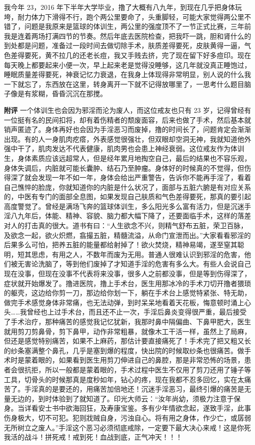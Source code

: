 \begin{case}
    我今年 23，2016 年下半年大学毕业，撸了大概有八九年，到现在几乎把身体玩垮，耐力体力下滑得不行，跑个两公里要命了，头重脚轻，可能大家觉得两公里不错了，问题是我原来是篮球的体训生，两公里的强度顶不了一节正式比赛，三年前我是连着两场打满四节的节奏。然后年底去医院检查，把我吓一跳，胆和肾什么的到处都是问题，准备过一段时间去做切除手术，肤质差得要死，皮肤黄得一逼，气色差得要死，黄不拉几的还老长痘，我又手贱去挤，完了现在留下好多痘印。现在每天晚上都要起来小便一次，早上起来老是觉得没睡够，这几年就没真正睡饱过，睡眠质量差得要死，神衰记忆力衰退，在我身上体现得非常明显，别人说的什么我一下就忘了，东西放在这里，转身离开一下就不记得放哪里了，一思考什么题目脑子像是有浆糊，昏昏沉沉在那搅。

    \textbf{附评} 一个体训生也会因为邪淫而沦为废人，而这位戒友也只有 23 岁，记得曾经有一位挺有名的民间扣将，却有着伤精者的颓废面容，后来也做了手术，然后基本就销声匿迹了。身体再好也会因为手淫恶习而废掉，撸的时间长了，问题肯定会渐渐出现。有的人一身肌肉疙瘩，外表感觉很强壮，但双眼却空洞无神，我就知道他外强中干了，肌肉发达不代表健康，肌肉男也会患上神经衰弱。这位戒友作为体训生，身体素质应该远超常人，但是经年累月地掏空自己，最后的结果也不容乐观，身体失调后，内脏就可能长囊肿、结石乃至肿瘤。身体好的时候真的不觉得，但伤得深了就会发现一年不如一年，身体会给出严重警告，告诉你不能再手淫了，看着自己憔悴的脸庞，你就知道你的内脏是什么状况了，面部与五脏六腑是有对应关系的，中医有专门的面部全息图，如果发现自己肤质和气色差得要死，那真的要引起高度警觉了。曾经是满场飞奔的篮球体训生，多么阳光多么富有活力，但是沉迷手淫八九年后，体能、精神、容貌、脑力都大幅下降了，还要面临手术，这样的落差对人的打击真的很大。道书有曰：“人生欲念不兴，则精气舒布五脏，荣卫百脉，及欲念一起，欲火炽燃，翕撮五脏，精髓流溢，从命门宣泄而出。”大家看看邪淫的后果多么可怕，把养五脏的能量都给射掉了！欲火焚烧，精神易竭，遂至窒其聪明，短其思虑，有用之人，不数年而废为无用。普通人很难认识到邪淫的危害，他们被无害论洗脑了，等到他们废掉了才知道手淫的危害有多么大。有些人会说自己现在没事，但现在没事不代表将来没事，很多人之前都没事，但是等到伤得深了，症状就开始爆发了。撸进医院，撸上手术台，医生用那冰冷的手术刀切开撸者猥琐的躯壳，这边给你剪一刀，那边给你划一下，躺在手术台上感觉特紧张、特无助，做完手术感觉身体非常痛，也无法动弹，到时呆呆地看着天花板，悔意顿时涌上心头……我曾经也上过手术台，而且还不止一次，手淫后鼻炎变得很严重，最后接受了手术治疗，那种痛苦的感觉我记忆犹新，我那时鼻中隔偏曲、下鼻甲肥大，医生就用剪刀剪鼻骨，剪下鼻甲，动作非常粗暴，就像木工干活一样，虽然上了局麻，但还是感觉特别痛苦，如果不上麻药，那估计要直接痛死了！手术完了把又粗又长的纱条塞满整个鼻孔，几乎是塞到爆的程度，快出院的时候取纱条也很痛苦。做手术时是蒙着眼的，如果看到医生用剪刀伸进自己的鼻腔，那是非常恐怖的场景，患者会很抗拒，所以一般都是蒙着眼的，手术过程中医生不仅用了剪刀还用了锤子等工具，切骨头的时候那真是度秒如年，钻心的疼，现在我都不忍多回忆，实在太痛苦了。手淫真的是要还的，用痛苦加倍地还！沉迷手淫恶习，最终引爆的痛苦是无量无边的，到时体验到了就知道了。印光大师云：“汝年尚幼，须极力注意于保身。当详看安士书中欲海回狂，及寿康宝鉴。多有少年情欲念起，遂致手淫，此事伤身极大，切不可犯。犯则戕贼自身，污浊自心。将有用之身体，作少亡，或孱弱无所树立之废人。”手淫这个恶习必须彻底戒除，一定要下最大决心来戒！这是你死我活的战斗！拼死戒！戒到死！血战到底，正气冲天！！！
\end{case}

